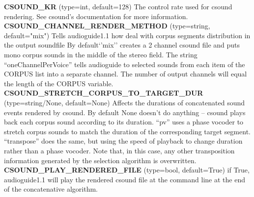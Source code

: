 \documentclass{article}
\newcommand{\optEntry}[4]{\textbf{#1} (type=#2, default=#3) #4\hspace{0.5em}\\}
\newcommand{\ag}{audioguide1.1 }
\begin{document}
\begin{spacing}{1.2}
\optEntry{CSOUND\_KR}{int}{128}{The control rate used for csound rendering.  See csound's documentation for more information.}

\optEntry{CSOUND\_CHANNEL\_RENDER\_METHOD}{string}{"mix"}{Tells \ag how deal with corpus segments distribution in the output soundfile  By default`'mix'' creates a 2 channel csound file and puts mono corpus sounds in the middle of the stereo field.  The string ``oneChannelPerVoice'' tells audioguide to selected sounds from each item of the CORPUS list into a separate channel.  The number of output channels will equal the length of the CORPUS variable.}

\optEntry{CSOUND\_STRETCH\_CORPUS\_TO\_TARGET\_DUR}{string/None}{None}{Affects the durations of concatenated sound events rendered by csound.  By default None doesn't do anything -- csound plays back each corpus sound according to its duration.  ``pv'' uses a phase vocoder to stretch corpus sounds to match the duration of the corresponding target segment.  ``transpose'' does the same, but using the speed of playback to change duration rather than a phase vocoder.  Note that, in this case, any other transposition information generated by the selection algorithm is overwritten.}

\optEntry{CSOUND\_PLAY\_RENDERED\_FILE}{bool}{True}{if True, \ag will play the rendered csound file at the command line at the end of the concatenative algorithm.}



%
%





\end{spacing}
\end{document}
